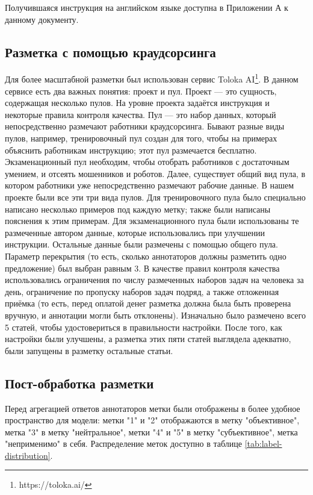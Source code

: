 \documentclass[conference]{IEEEtran}
\begin{document}
Получившаяся инструкция на английском языке доступна в Приложении А к данному документу.

\subsection{Разметка с помощью краудсорсинга}
Для более масштабной разметки был использован сервис Toloka AI\footnote{https://toloka.ai/}. В данном сервисе есть два важных понятия: проект и пул. Проект --- это сущность, содержащая несколько пулов. На уровне проекта задаётся инструкция и некоторые правила контроля качества. Пул --- это набор данных, который непосредственно размечают работники краудсорсинга. Бывают разные виды пулов, например, тренировочный пул создан для того, чтобы на примерах объяснить работникам инструкцию; этот пул размечается бесплатно. Экзаменационный пул необходим, чтобы отобрать работников с достаточным умением, и отсеять мошенников и роботов. Далее, существует общий вид пула, в котором работники уже непосредственно размечают рабочие данные. В нашем проекте были все эти три вида пулов. Для тренировочного пула было специально написано несколько примеров под каждую метку; также были написаны пояснения к этим примерам. Для экзаменационного пула были использованы те размеченные автором данные, которые использовались при улучшении инструкции. Остальные данные были размечены с помощью общего пула. Параметр перекрытия (то есть, сколько аннотаторов должны разметить одно предложение) был выбран равным 3. В качестве правил контроля качества использовались ограничения по числу размеченных наборов задач на человека за день, ограничение по пропуску наборов задач подряд, а также отложенная приёмка (то есть, перед оплатой денег разметка должна была быть проверена вручную, и аннотации могли быть отклонены). Изначально было размечено всего 5 статей, чтобы удостовериться в правильности настройки. После того, как настройки были улучшены, а разметка этих пяти статей выглядела адекватно, были запущены в разметку остальные статьи.

\subsection{Пост-обработка разметки}
Перед агрегацией ответов аннотаторов метки были отображены в более удобное пространство для модели: метки "1" и "2" отображаются в метку "объективное", метка "3" в метку "нейтральное", метки "4" и "5" в метку "субъективное", метка "неприменимо" в себя. Распределение меток доступно в таблице \ref{tab:label-distribution}.
\end{document}

